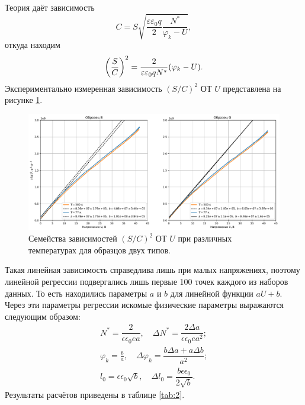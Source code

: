 \documentclass[14pt, russian, a4paper]{extarticle}
\begin{document}
Теория даёт зависимость 
\begin{equation}
	C = S \sqrt{\frac{\varepsilon \varepsilon_0 q}{2} \frac{N^*}{\varphi_k - U}},
\end{equation}
откуда находим
\begin{equation}
	\qty(\frac{S}{C})^2 = \frac{2}{\varepsilon \varepsilon_0 q N^*} (\varphi_k - U).
\end{equation}
Экспериментально измеренная зависимость $(S/C)^2$ ОТ ${U}$ представлена на рисунке \ref{fig:sc2_v}.

\begin{figure}[htbp]
		\centering
		\includegraphics[width=\textwidth]{../figures/sc2_v.pdf}
	\caption{Семейства зависимостей ${(S/C)^2}$ ОТ ${U}$ при различных температурах для образцов двух типов.}
		\label{fig:sc2_v}
	\end{figure}

Такая линейная зависимость справедлива лишь при малых напряжениях, поэтому линейной регрессии подвергались лишь первые 100 точек каждого из наборов данных. То есть находились параметры $a$ и $b$ для линейной функции $aU+b$. Через эти параметры регрессии искомые физические параметры выражаются следующим образом:
\begin{equation}
 	\begin{split}
 		N^* = \dfrac{2}{\epsilon\epsilon_0 e a},\quad \Delta N^* = \dfrac{2\Delta a}{\epsilon\epsilon_0 e a^2};\\
 		\varphi_k = \frac{b}{a},\quad \Delta \varphi_k = \dfrac{b \Delta a + a \Delta b}{a^2};\\
 		l_0 = \epsilon\epsilon_0\sqrt{b},\quad \Delta l_0 = \dfrac{b \epsilon\epsilon_0}{2 \sqrt{b}}.
 	\end{split}
 \end{equation}
 Результаты расчётов приведены в таблице \ref{tab:2}.
\end{document}

